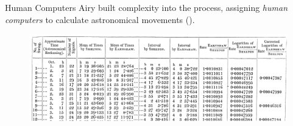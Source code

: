 \documentclass[presentation]{subfiles}
\begin{document}
\begin{frame}{Human Computers}
    Airy built complexity into the process, assigning \emph{human computers} 
    to calculate astronomical movements (\cite{grier2013computers}).

    \begin{figure}
    \includegraphics[width=\textwidth]{../../common_figures/complexity/pw_literature/airy.png}
    \end{figure}
\end{frame}



\end{document}
